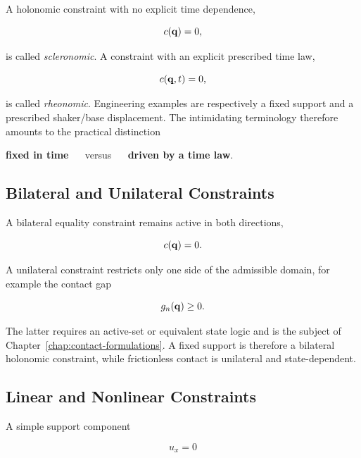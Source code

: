 A holonomic constraint with no explicit time dependence,

\begin{equation}
    c(\mathbf{q})=0,
\end{equation}

is called \textit{scleronomic}. A constraint with an explicit prescribed time
law,

\begin{equation}
    c(\mathbf{q},t)=0,
\end{equation}

is called \textit{rheonomic}. Engineering examples are respectively a fixed
support and a prescribed shaker/base displacement. The intimidating terminology
therefore amounts to the practical distinction

\begin{center}
\textbf{fixed in time} $\quad$ versus $\quad$ \textbf{driven by a time law}.
\end{center}

\subsection{Bilateral and Unilateral Constraints}

A bilateral equality constraint remains active in both directions,

\begin{equation}
    c(\mathbf{q})=0.
\end{equation}

A unilateral constraint restricts only one side of the admissible domain, for
example the contact gap

\begin{equation}
    g_n(\mathbf{q})\ge0.
\end{equation}

The latter requires an active-set or equivalent state logic and is the subject
of Chapter~\ref{chap:contact-formulations}. A fixed support is therefore a
bilateral holonomic constraint, while frictionless contact is unilateral and
state-dependent.

\subsection{Linear and Nonlinear Constraints}

A simple support component

\begin{equation}
    u_x=0
\end{equation}

